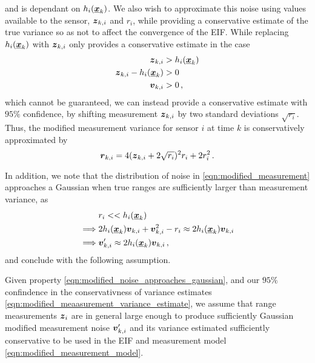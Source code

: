 \documentclass[twocolumn]{autart}
\begin{document}
and is dependant on $h_i({\boldsymbol{\underline{x}}}_k)$. We also wish to approximate this noise using values available to the sensor, ${\boldsymbol{z}}_{k,i}$ and $r_i$, while providing a conservative estimate of the true variance so as not to affect the convergence of the EIF. While replacing $h_i({\boldsymbol{\underline{x}}}_k)$ with ${\boldsymbol{z}}_{k,i}$ only provides a conservative estimate in the case
\begin{equation}
    \begin{split}
        {\boldsymbol{z}}_{k,i} &> h_i({\boldsymbol{\underline{x}}}_k) \\
        {\boldsymbol{z}}_{k,i} - h_i({\boldsymbol{\underline{x}}}_k) &> 0 \\
        {\boldsymbol{v}}_{k,i} &> 0\,,
    \end{split}
\end{equation}
which cannot be guaranteed, we can instead provide a conservative estimate with $95\%$ confidence, by shifting measurement ${\boldsymbol{z}}_{k,i}$ by two standard deviations $\sqrt{r_i}$. Thus, the modified measurement variance for sensor $i$ at time $k$ is conservatively approximated by
\begin{equation}
    {\boldsymbol{r}}_{k, i} = 4({\boldsymbol{z}}_{k,i} + 2\sqrt{r_i})^2r_i + 2r_i^2\,. \label{eqn:modified_meaasurement_variance_estimate}
\end{equation}

In addition, we note that the distribution of noise in \eqref{eqn:modified_measurement} approaches a Gaussian when true ranges are sufficiently larger than measurement variance, as
\begin{equation}
    \begin{split}
        &r_i << h_i({\boldsymbol{\underline{x}}}_k) \\
        \implies &2h_i({\boldsymbol{\underline{x}}}_k){\boldsymbol{v}}_{k,i} + {\boldsymbol{v}}_{k,i}^2 - r_i \approx 2h_i({\boldsymbol{\underline{x}}}_k){\boldsymbol{v}}_{k,i} \\
        \implies &{\boldsymbol{v}}'_{k,i} \approx 2h_i({\boldsymbol{\underline{x}}}_k){\boldsymbol{v}}_{k,i}\,,
    \end{split} \label{eqn:modified_noise_approaches_gaussian}
\end{equation}
and conclude with the following assumption.
\begin{assum}
    Given property \eqref{eqn:modified_noise_approaches_gaussian}, and our $95\%$ confindence in the conservativness of variance estimates \eqref{eqn:modified_meaasurement_variance_estimate}, we assume that range measurements ${\boldsymbol{z}}_i$ are in general large enough to produce sufficiently Gaussian modified measurement noise ${\boldsymbol{v}}'_{k,i}$ and its variance estimated sufficiently conservative to be used in the EIF and measurement model \eqref{eqn:modified_measurement_model}.
\end{assum}
\end{document}
